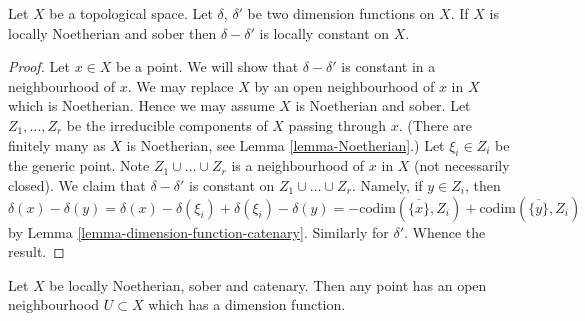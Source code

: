 \begin{lemma}
\label{lemma-dimension-function-unique}
Let $X$ be a topological space.
Let $\delta$, $\delta'$ be two dimension functions on $X$.
If $X$ is locally Noetherian and sober then $\delta - \delta'$ is
locally constant on $X$.
\end{lemma}

\begin{proof}
Let $x \in X$ be a point. We will show that $\delta - \delta'$ is
constant in a neighbourhood of $x$.
We may replace $X$ by an open neighbourhood
of $x$ in $X$ which is Noetherian. Hence we may assume $X$ is
Noetherian and sober.
Let $Z_1, \ldots, Z_r$ be the irreducible
components of $X$ passing through $x$. (There are finitely many as
$X$ is Noetherian, see Lemma \ref{lemma-Noetherian}.)
Let $\xi_i \in Z_i$ be the generic point.
Note $Z_1 \cup \ldots \cup Z_r$ is a neighbourhood of $x$ in $X$
(not necessarily closed). We claim that $\delta - \delta'$ is
constant on $Z_1 \cup \ldots \cup Z_r$. Namely, if $y \in Z_i$,
then
$$
\delta(x) - \delta(y) = \delta(x) - \delta(\xi_i) + \delta(\xi_i) - \delta(y)
= - \text{codim}(\overline{\{x\}}, Z_i) 
+ \text{codim}(\overline{\{y\}}, Z_i)
$$
by Lemma \ref{lemma-dimension-function-catenary}.
Similarly for $\delta'$. Whence the result.
\end{proof}

\begin{lemma}
\label{lemma-locally-dimension-function}
Let $X$ be locally Noetherian, sober and catenary.
Then any point has an open neighbourhood
$U \subset X$ which has a dimension function.
\end{lemma}


